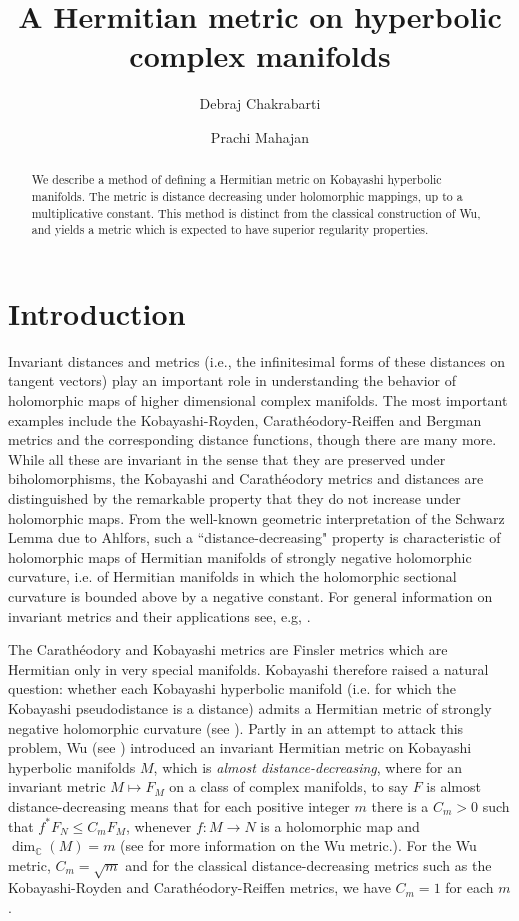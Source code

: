 \documentclass[a4paper,11pt,reqno]{amsart}
\title{A Hermitian metric on hyperbolic complex manifolds}
\author{Debraj Chakrabarti}
\author{Prachi Mahajan}
\theoremstyle{plain}
\theoremstyle{definition}
\theoremstyle{remark}
\theoremstyle{remark}
\numberwithin{equation}{section}
\newcommand{\cx}{{\mathbb C}}
\begin{document}
\begin{abstract} We describe a method of defining a Hermitian metric on Kobayashi hyperbolic manifolds. The metric is distance decreasing
under holomorphic mappings, up to a multiplicative constant. This method is distinct from the classical construction of Wu, and yields a metric which is expected 
to have superior regularity properties.
\end{abstract}
\maketitle


	
\section{Introduction}
Invariant distances and metrics (i.e., the infinitesimal forms of these distances on tangent vectors) play an important role in understanding the behavior of holomorphic maps of higher dimensional
complex manifolds. The most important examples include the Kobayashi-Royden, Carath\'{e}odory-Reiffen and Bergman metrics and the corresponding distance functions, though there are many more.
While all these are invariant in the sense that 
they are preserved under biholomorphisms, the Kobayashi and Carath\'{e}odory metrics and distances are distinguished by the remarkable property 
that they do not  increase under holomorphic maps. From 
the well-known  geometric interpretation of the Schwarz Lemma due 
to Ahlfors, such a ``distance-decreasing" property is characteristic 
of holomorphic maps of Hermitian manifolds of strongly negative holomorphic curvature, i.e. of Hermitian manifolds in which the holomorphic sectional curvature is bounded above by a negative constant. For general information 
on invariant metrics and their applications see, e.g, \cite{mahabharata,abate}.

The Carath\'{e}odory and Kobayashi metrics are  Finsler metrics which are Hermitian only in very special manifolds.
Kobayashi therefore raised a natural question: whether each Kobayashi hyperbolic manifold (i.e. for which the Kobayashi pseudodistance is a distance)  admits a Hermitian metric of 
strongly negative holomorphic curvature (see \cite{kobayashi1}). Partly  in an attempt to attack 
this problem, Wu (see \cite{wu1993}) introduced 
an invariant Hermitian metric  on Kobayashi hyperbolic manifolds $M$, which is \emph{almost distance-decreasing}, where  for an invariant
metric $M\mapsto F_M$ on a class of complex manifolds, to say
$F$ is almost distance-decreasing means
that for each positive integer $m$ there is a $C_m>0$ such that
$f^* F_N \leq C_m F_M$, whenever $f:M\to N$ is
a holomorphic map and $\dim_\cx(M)=m$ (see \cite{kim,mahabharata} for more information on the Wu metric.). For the Wu metric, $C_m = \sqrt{m}$ and  for the classical distance-decreasing metrics such as the Kobayashi-Royden and Carath\'{e}odory-Reiffen metrics, we have $C_m=1$ for each $m$.
\end{document}
